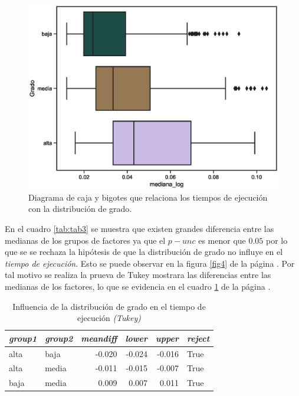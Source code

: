 \documentclass{article}
\begin{document}
\begin{center}
\begin{figure}[htbp]
\includegraphics[scale=0.6]{boxplot_Grado.eps}
\caption{Diagrama de caja y bigotes que relaciona los tiempos de ejecución con la distribución de grado.}
\label{fig13}
\end{figure}
\end{center}

En el cuadro \ref{tab:tab3} se muestra que existen grandes diferencia entre las medianas de los grupos de factores ya que el \textbf{$p-unc$} es menor que $0.05$ por lo que se se rechaza la hipótesis de que la distribución de grado no influye en el \textit{tiempo de ejecución}. Esto se puede observar en la figura \ref{fig4} de la página \pageref{fig4}. Por tal motivo se realiza la prueva de Tukey mostrara las diferencias entre las medianas de los factores, lo que se evidencia en el cuadro \ref{tab:t4} de la página \pageref{tab:t4}.
\begin{table}[htbp]
  \centering
  \caption{Influencia de la distribución de grado en el tiempo de ejecución \textit{(Tukey)}}
    \begin{tabular}{llrrrl}
    \toprule
    \textit{\textbf{group1}} & \textit{\textbf{group2}} & \multicolumn{1}{l}{\textit{\textbf{meandiff}}} & \multicolumn{1}{l}{\textit{\textbf{lower}}} & \multicolumn{1}{l}{\textit{\textbf{upper}}} & \textit{\textbf{reject}} \\
    \midrule
    alta  & baja  & -0.020 & -0.024 & -0.016 & True \\
    alta  & media & -0.011 & -0.015 & -0.007 & True \\
    baja  & media & 0.009 & 0.007 & 0.011 & True \\
    \bottomrule
    \end{tabular}%
  \label{tab:t4}%
\end{table}%
\end{document}
